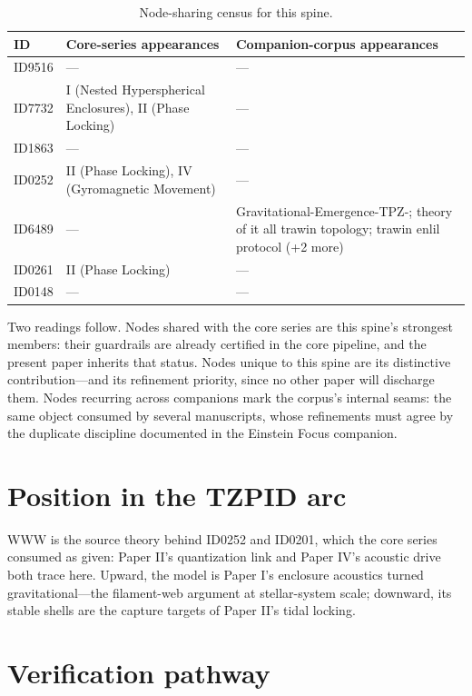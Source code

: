 \documentclass[11pt]{article}
\theoremstyle{remark}
\begin{document}
\begin{table}[ht]
\centering
\small
\caption{Node-sharing census for this spine.}
\label{tab:crosswalk}
\begin{tabular}{lp{4.4cm}p{6.6cm}}
\toprule
ID & Core-series appearances & Companion-corpus appearances \\
\midrule
ID9516 & --- & --- \\
ID7732 & I (Nested Hyperspherical Enclosures), II (Phase Locking) & --- \\
ID1863 & --- & --- \\
ID0252 & II (Phase Locking), IV (Gyromagnetic Movement) & --- \\
ID6489 & --- & Gravitational-Emergence-TPZ-; theory of it all trawin topology; trawin enlil protocol (+2 more) \\
ID0261 & II (Phase Locking) & --- \\
ID0148 & --- & --- \\
\bottomrule
\end{tabular}
\end{table}

Two readings follow. Nodes shared with the core series are this spine's strongest members: their guardrails are already certified in the core pipeline, and the present paper inherits that status. Nodes unique to this spine are its distinctive contribution---and its refinement priority, since no other paper will discharge them. Nodes recurring across companions mark the corpus's internal seams: the same object consumed by several manuscripts, whose refinements must agree by the duplicate discipline documented in the Einstein Focus companion.

\section{Position in the TZPID arc}
\label{sec:arc}

WWW is the source theory behind ID0252 and ID0201, which the core series consumed as given: Paper II's quantization link and Paper IV's acoustic drive both trace here. Upward, the model is Paper I's enclosure acoustics turned gravitational---the filament-web argument at stellar-system scale; downward, its stable shells are the capture targets of Paper II's tidal locking.

\section{Verification pathway}
\label{sec:verify}
\end{document}
